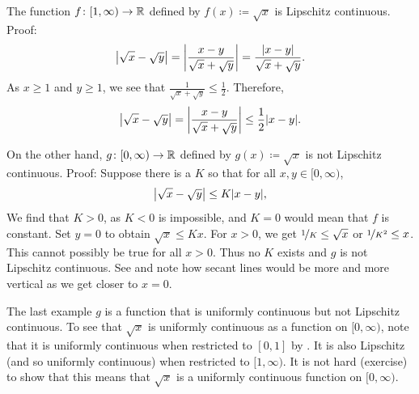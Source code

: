 \begin{example}
The function $f \colon [1,\infty) \to {\mathbb{R}}$ defined by $f(x) \coloneqq \sqrt{x}$
is Lipschitz continuous. Proof:
\begin{equation*}
\left\lvert {\sqrt{x}-\sqrt{y}} \right\rvert = 
\left\lvert {\frac{x-y}{\sqrt{x}+\sqrt{y}}} \right\rvert
=
\frac{\lvert {x-y} \rvert}{\sqrt{x}+\sqrt{y}} .
\end{equation*}
As $x \geq 1$ and $y \geq 1$, we see that $\frac{1}{\sqrt{x}+\sqrt{y}}
\leq \frac{1}{2}$.  Therefore,
\begin{equation*}
\left\lvert {\sqrt{x}-\sqrt{y}} \right\rvert = 
\left\lvert {\frac{x-y}{\sqrt{x}+\sqrt{y}}} \right\rvert
\leq
\frac{1}{2}
\lvert {x-y} \rvert.
\end{equation*}

On the other hand, $g \colon [0,\infty) \to {\mathbb{R}}$ defined by
$g(x) \coloneqq \sqrt{x}$ is not Lipschitz continuous.  Proof:
Suppose there is a $K$ so that for all $x,y \in [0,\infty)$,
\begin{equation*}
\left\lvert {\sqrt{x}-\sqrt{y}} \right\rvert 
\leq
K \lvert {x-y} \rvert ,
\end{equation*}
We find that $K > 0$, as $K < 0$ is impossible,
and $K=0$ would mean that $f$ is constant.
Set $y=0$ to obtain
$\sqrt{x} \leq K x$.
For $x > 0$, we get
$\nicefrac{1}{K} \leq \sqrt{x}$ or $\nicefrac{1}{K^2} \leq x$.
This cannot possibly be true for all
$x > 0$.  Thus no $K$ exists and $g$ is not
Lipschitz continuous.  See  and note how secant
lines would be more and more vertical as we get closer to $x=0$.
\begin{myfigureht}
\caption{Graph of $\sqrt{x}$ and some secant lines through $(0,0)$ and
$(x,\sqrt{x})$.\label{fig:sqrtgraph}}
\end{myfigureht}

The last example $g$ is a function that is uniformly
continuous but not Lipschitz continuous.
To see that $\sqrt{x}$ is
uniformly continuous as a function on $[0,\infty)$,
note that it is uniformly continuous when restricted to $[0,1]$ by .
It is also Lipschitz (and so uniformly continuous) when restricted to $[1,\infty)$.
It is not hard (exercise) to show that this means that $\sqrt{x}$ is a
uniformly continuous function on $[0,\infty)$.
\end{example}

